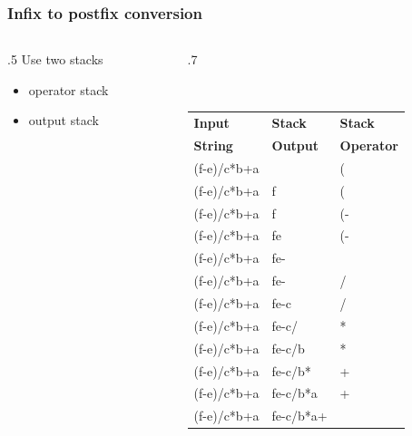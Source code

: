 \documentclass[aspectratio=169,10pt,compress]{beamer}
\begin{document}







\begin{frame}\frametitle{Infix to postfix conversion}
	\begin{columns}[T] %
	\begin{column}{.5\linewidth} %
	    	Use two stacks
		\begin{itemize}
			\item
			operator stack
			\item
			output stack
		\end{itemize}
	\end{column} %
	\begin{column}{.7\linewidth} %
	
			\vspace{-0.8cm}
{\small 
{\tt %
\begin{center}
\begin{tabular}{|l|l|l|}
\hline
\textbf{Input } &\textbf{Stack} &\textbf{Stack}\\
\textbf{String} &\textbf{Output} &\textbf{Operator}\\
\hline
(f-e)/c*b+a & &(\\
(f-e)/c*b+a &f &(\\
(f-e)/c*b+a &f &(-\\
(f-e)/c*b+a &fe &(-\\
(f-e)/c*b+a &fe- &\\
(f-e)/c*b+a &fe- &/\\
(f-e)/c*b+a &fe-c &/\\
(f-e)/c*b+a &fe-c/ &*\\
(f-e)/c*b+a &fe-c/b &*\\
(f-e)/c*b+a &fe-c/b* &+\\
(f-e)/c*b+a &fe-c/b*a &+\\
(f-e)/c*b+a &fe-c/b*a+ &\\
\hline
\end{tabular}
\end{center}
}}

	\end{column} %
	\end{columns} %
\end{frame}
\end{document}
